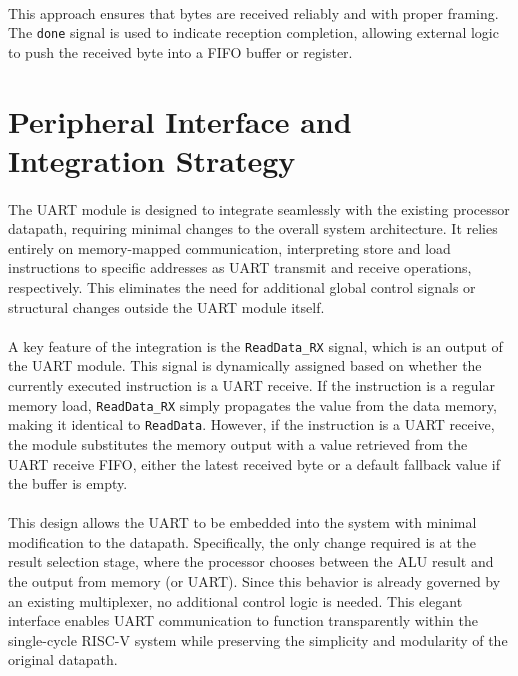 \documentclass[12pt]{report}
\begin{document}
\paragraph{}
This approach ensures that bytes are received reliably and with proper framing. The \texttt{done} signal is used to indicate reception completion, allowing external logic to push the received byte into a FIFO buffer or register.

\section{Peripheral Interface and Integration Strategy}

\paragraph{}
The UART module is designed to integrate seamlessly with the existing processor datapath, requiring minimal changes to the overall system architecture. It relies entirely on memory-mapped communication, interpreting store and load instructions to specific addresses as UART transmit and receive operations, respectively. This eliminates the need for additional global control signals or structural changes outside the UART module itself.

\paragraph{}
A key feature of the integration is the \texttt{ReadData\_RX} signal, which is an output of the UART module. This signal is dynamically assigned based on whether the currently executed instruction is a UART receive. If the instruction is a regular memory load, \texttt{ReadData\_RX} simply propagates the value from the data memory, making it identical to \texttt{ReadData}. However, if the instruction is a UART receive, the module substitutes the memory output with a value retrieved from the UART receive FIFO, either the latest received byte or a default fallback value if the buffer is empty.

\paragraph{}
This design allows the UART to be embedded into the system with minimal modification to the datapath. Specifically, the only change required is at the result selection stage, where the processor chooses between the ALU result and the output from memory (or UART). Since this behavior is already governed by an existing multiplexer, no additional control logic is needed. This elegant interface enables UART communication to function transparently within the single-cycle RISC-V system while preserving the simplicity and modularity of the original datapath.
\end{document}
